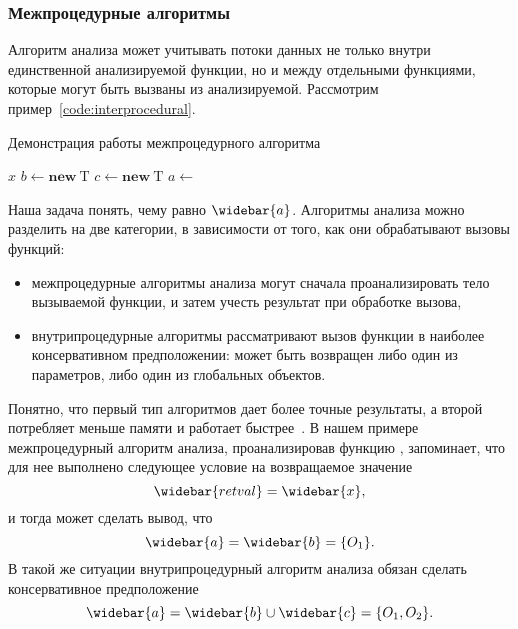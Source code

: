 \documentclass[14pt,titlepage,draft]{extarticle}
\newcommand{\type}[1]{\mathrm{#1}}
\newcommand{\op}[1]{\mathbf{#1}}
\newcommand{\pts}[1]{\widebar{#1}}
\begin{document}
      \subsubsection{Межпроцедурные алгоритмы}

        Алгоритм анализа может учитывать потоки данных не только внутри
        единственной анализируемой функции, но и между отдельными функциями,
        которые могут быть вызваны из анализируемой.
        Рассмотрим пример~\ref{code:interprocedural}.

        \begin{algorithm}
          \caption{Демонстрация работы межпроцедурного алгоритма}
          \label{code:interprocedural}
          \begin{algorithmic}[1]
              \State \Return $x$
            \EndFunction
            \Statex
            \State $b \gets \op{new}~\type{T}$
            \State $c \gets \op{new}~\type{T}$
            \State $a \gets$ 
          \end{algorithmic}
        \end{algorithm}

        Наша задача понять, чему равно $\pts{a}$.
        Алгоритмы анализа можно разделить на две категории, в зависимости от
        того, как они обрабатывают вызовы функций:
        \begin{itemize}
          \item межпроцедурные алгоритмы анализа могут сначала проанализировать
                тело вызываемой функции, и затем учесть результат при обработке
                вызова,
          \item внутрипроцедурные алгоритмы рассматривают вызов функции в
                наиболее консервативном предположении: может быть возвращен
                либо один из параметров, либо один из глобальных объектов.
        \end{itemize}
        Понятно, что первый тип алгоритмов дает более точные результаты,
        а второй потребляет меньше памяти и работает
        быстрее~\cite[с.~117]{andersen}.
        В нашем примере межпроцедурный алгоритм анализа, проанализировав
        функцию , запоминает, что для нее выполнено следующее условие
        на возвращаемое значение
        \[\pts{retval} = \pts{x},\]
        и тогда может сделать вывод, что \[\pts{a} = \pts{b} = \{O_1\}.\]
        В такой же ситуации внутрипроцедурный алгоритм анализа обязан сделать
        консервативное предположение
        \[\pts{a} = \pts{b} \cup \pts{c} = \{O_1, O_2\}.\]
\end{document}
